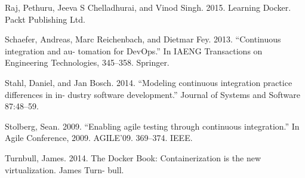 Raj, Pethuru, Jeeva S Chelladhurai, and Vinod Singh. 2015. Learning Docker. Packt Publishing Ltd.

Schaefer, Andreas, Marc Reichenbach, and Dietmar Fey. 2013. “Continuous integration and au- tomation for DevOps.” In IAENG Transactions on Engineering Technologies, 345–358. Springer.

Stahl, Daniel, and Jan Bosch. 2014. “Modeling continuous integration practice differences in in- dustry software development.” Journal of Systems and Software 87:48–59.

Stolberg, Sean. 2009. “Enabling agile testing through continuous integration.” In Agile Conference, 2009. AGILE’09. 369–374. IEEE.

Turnbull, James. 2014. The Docker Book: Containerization is the new virtualization. James Turn- bull.

\newpage
